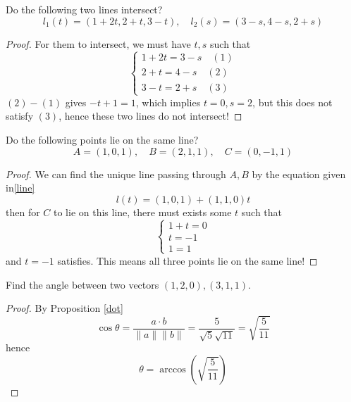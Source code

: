\documentclass[openany]{book}
\begin{document}
\begin{prob}
    Do the following two lines intersect?
    \begin{equation*}
        l_1(t)=(1+2t, 2+t, 3-t), \quad l_2(s)=(3-s, 4-s, 2+s)
    \end{equation*}
\end{prob}
\begin{proof}
    For them to intersect, we must have $t,s$ such that 
    \begin{equation*}
        \begin{cases}
            1+2t=3-s \quad (1)\\
            2+t=4-s \quad (2)\\
            3-t=2+s \quad (3)
        \end{cases}
    \end{equation*}
    $(2)-(1)$ gives $-t+1=1$, which implies $t=0, s=2$, but this does not satisfy $(3)$, hence these two lines do not intersect!
\end{proof}


\begin{prob}
    Do the following points lie on the same line?
    \begin{equation*}
        A=(1,0,1),\quad B=(2,1,1), \quad C=(0,-1,1)
    \end{equation*}
\end{prob}
\begin{proof}
    We can find the unique line passing through $A,B$ by the equation given in\ref{line}
    \begin{equation*}
        l(t)=(1,0,1)+(1,1,0)t
    \end{equation*}
    then for $C$ to lie on this line, there must exists some $t$ such that 
    \begin{equation*}
        \begin{cases}
            1+t=0\\
            t=-1\\
            1=1
        \end{cases}
    \end{equation*}
    and $t=-1$ satisfies. This means all three points lie on the same line!
\end{proof}


\begin{prob}
    Find the angle between two vectors $(1,2,0), (3,1,1)$.
\end{prob}
\begin{proof}
    By Proposition \ref{dot} 
    \begin{equation*}
        \cos\theta=\frac{a\cdot b}{\|a\|\|b\|}=\frac{5}{\sqrt{5}\sqrt{11}}=\sqrt{\frac{5}{11}}
    \end{equation*}
    hence 
    \begin{equation*}
        \theta=\arccos\left(\sqrt{\frac{5}{11}}\right)
    \end{equation*}
\end{proof}
\end{document}
